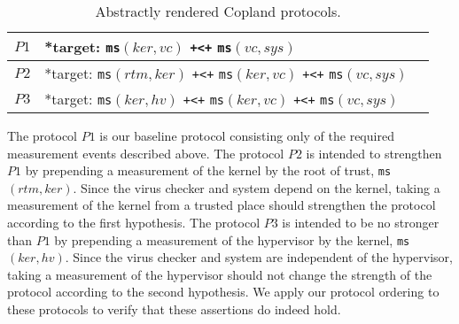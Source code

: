 \documentclass[runningheads]{llncs}
\theoremstyle{definition}
\begin{document}
\begin{table}[h]
  \setlength\extrarowheight{7pt}
  \centering
  \footnotesize
  \begin{tabular}{|M{1cm}|M{8cm}|N}
      \hline  
      $P1$ & *target:  \texttt{ms}$(ker, vc)$ \texttt{+<+} \texttt{ms}$(vc, sys)$ &\\ \hline 
      $P2$ & *target: \texttt{ms}$(rtm, ker)$ \texttt{+<+} \texttt{ms}$(ker, vc)$ \texttt{+<+} \texttt{ms}$(vc, sys)$ &\\
      \hline
      $P3$ & *target: \texttt{ms}$(ker, hv)$ \texttt{+<+} \texttt{ms}$(ker, vc)$ \texttt{+<+} \texttt{ms}$(vc, sys)$ &\\ \hline 
  \end{tabular}
  \caption[Chase Analysis with Varied Dependencies]{Abstractly rendered Copland protocols.}
  \label{Chase-table}
\end{table}

The protocol $P1$ is our baseline protocol consisting only of
the required measurement events described above. The protocol
$P2$ is intended to strengthen $P1$ by prepending a measurement
of the kernel by the root of trust, \texttt{ms}$(rtm,ker)$. Since the virus checker and
system depend on the kernel, taking a measurement of the kernel from a
trusted place should strengthen the protocol according to the first hypothesis. 
The protocol $P3$ is intended to be no stronger than $P1$ by prepending 
a measurement of the hypervisor by the kernel,
\texttt{ms}$(ker,hv)$. Since the virus checker and system are
independent of the hypervisor, taking a measurement of the hypervisor
should not change the strength of the protocol according to the second hypothesis. 
We apply our protocol ordering to these protocols to verify that
these assertions do indeed hold.
\end{document}
